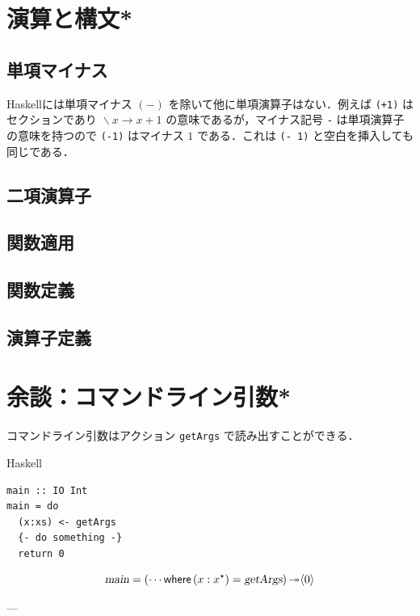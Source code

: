\documentclass[a4paper,twocolumn]{jsbook}
\newcommand{\programminglanguage}[1]{\textsf{#1}}
\newcommand{\haskell}{\programminglanguage{Haskell}}
\newcommand{\code}[1]{\texttt{#1}}
\newenvironment{haskellcode}{\begin{itembox}[r]{\haskell}}{\end{itembox}}
\newcommand{\mKeyword}[1]{\mathsf{#1}} %
\newcommand{\mWhereKeyword}{\mKeyword{where}}
\DeclareMathOperator{\mWhere}{\mWhereKeyword}
\newcommand{\mAction}[1]{\textsl{#1}}
\DeclareMathOperator{\mMain}{\mAction{main}}
\DeclareMathOperator{\mBindRightIgnore}{\twoheadrightarrow}
\DeclareMathOperator{\mLambda}{\backslash}
\DeclareMathOperator{\mLambdaArrow}{\rightarrow}
\newcommand{\mPureWith}[1]{\langle#1\rangle}
\newcommand{\mList}[1]{{#1}^\mathrm{\star}}
\newcommand{\mLambdaExp}[2]{\mLambda{#1}\mLambdaArrow{#2}}
\begin{document}
\section{演算と構文*}

\subsection{単項マイナス}

\haskell には単項マイナス $(-)$ を除いて他に単項演算子はない．例えば \code{(+1)} はセクションであり $\mLambdaExp{x}{x+1}$ の意味であるが，マイナス記号 \code{-} は単項演算子の意味を持つので \code{(-1)} はマイナス $1$ である．これは \code{(- 1)} と空白を挿入しても同じである．

\subsection{二項演算子}

\subsection{関数適用}

\subsection{関数定義}

\subsection{演算子定義}


\section{余談：コマンドライン引数*}

コマンドライン引数はアクション \code{getArgs} で読み出すことができる．

\begin{haskellcode}
\begin{verbatim}
main :: IO Int
main = do
  (x:xs) <- getArgs
  {- do something -}
  return 0
\end{verbatim}
\end{haskellcode}

\begin{equation}
\mMain=(\dotsb\mWhere{}(x:\mList{x})=\mAction{getArgs})\mBindRightIgnore\mPureWith{0}
\end{equation}

---
\end{document}
